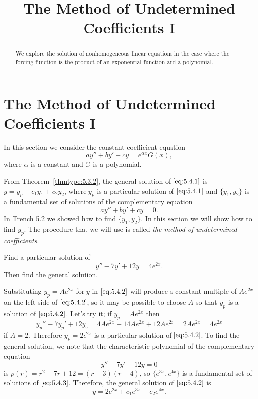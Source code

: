 \documentclass{ximera}
\title{The Method of Undetermined Coefficients I}
\begin{document}
 
\begin{abstract}
 We explore the solution of nonhomogeneous linear equations in the case where the forcing function is the product of an exponential function and a polynomial.
\end{abstract}
 
\maketitle
 
\section*{The Method of Undetermined Coefficients I}
 
In this section we consider the constant coefficient equation
\begin{equation} \label{eq:5.4.1}
ay''+by'+cy=e^{\alpha x}G(x),
\end{equation}
where $\alpha$ is a constant and $G$ is a polynomial.
 
 
From Theorem~\ref{thmtype:5.3.2}, the general solution of $\eqref{eq:5.4.1}$
is
$y=y_p+c_1y_1+c_2y_2$, where $y_p$ is a particular solution of
$\eqref{eq:5.4.1}$ and $\{y_1,y_2\}$ is a fundamental set of
solutions of the complementary equation
$$
ay''+by'+cy=0.
$$
In \href{https://xerxes.ximera.org/differentialequations/main/constantCoefficientHomogeneousEquations/constantCoefficientHomogeneousEquations}{Trench 5.2} we showed how to find $\{y_1,y_2\}$. In this
section we will show how to find $y_p$. The procedure that we will use is called \textit{the method of undetermined coefficients}.
 
 
\begin{example}\label{example:5.4.1}
Find a particular solution of
\begin{equation} \label{eq:5.4.2}
y''-7y'+12y=4e^{2x}.
\end{equation}
Then find the general solution.
 
 
\begin{explanation}
Substituting $y_p=Ae^{2x}$ for $y$ in $\eqref{eq:5.4.2}$ will produce a
constant multiple of $Ae^{2x}$ on the left side of $\eqref{eq:5.4.2}$, so it
may be possible to choose $A$ so that $y_p$ is a solution of
$\eqref{eq:5.4.2}$. Let's try it;   if $y_p=Ae^{2x}$ then
$$
y_p''-7y_p'+12y_p=4Ae^{2x}-14Ae^{2x}+12Ae^{2x}=2Ae^{2x}=4e^{2x}
$$
if $A=2$. Therefore $y_p=2e^{2x}$ is a particular solution of
$\eqref{eq:5.4.2}$. To find the general solution, we note that the
characteristic polynomial of the complementary equation
\begin{equation} \label{eq:5.4.3}
y''-7y'+12y=0
\end{equation}
is $p(r)=r^2-7r+12=(r-3)(r-4)$, so $\{e^{3x},e^{4x}\}$ is a
fundamental set of solutions of $\eqref{eq:5.4.3}$. Therefore, the general
solution of $\eqref{eq:5.4.2}$ is
$$
 y=2e^{2x}+c_1e^{3x}+c_2e^{4x}.
$$
 
\end{explanation}
\end{example}
 
\end{document}
